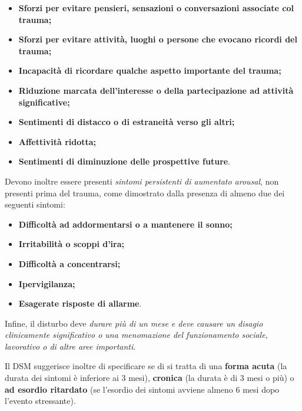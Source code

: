 \begin{itemize}
\item
  \textbf{Sforzi per evitare pensieri, sensazioni o conversazioni
  associate col trauma;}
\item
  \textbf{Sforzi per evitare attività, luoghi o persone che evocano
  ricordi del trauma;}
\item
  \textbf{Incapacità di ricordare qualche aspetto importante del
  trauma;}
\item
  \textbf{Riduzione marcata dell'interesse o della partecipazione ad
  attività significative;}
\item
  \textbf{Sentimenti di distacco o di estraneità verso gli altri;}
\item
  \textbf{Affettività ridotta;}
\item
  \textbf{Sentimenti di diminuzione delle prospettive future}.
\end{itemize}

Devono inoltre essere presenti \emph{sintomi persistenti di aumentato
arousal}, non presenti prima del trauma, come dimostrato dalla presenza
di almeno due dei seguenti sintomi:

\begin{itemize}
\item
  \textbf{Difficoltà ad addormentarsi o a mantenere il sonno;}
\item
  \textbf{Irritabilità o scoppi d'ira;}
\item
  \textbf{Difficoltà a concentrarsi;}
\item
  \textbf{Ipervigilanza;}
\item
  \textbf{Esagerate risposte di allarme}.
\end{itemize}

Infine, il disturbo deve \emph{durare più di un mese e deve causare un
disagio clinicamente significativo o una menomazione del funzionamento
sociale, lavorativo o di altre aree importanti}.

Il DSM suggerisce inoltre di specificare se di si tratta di una
\textbf{forma acuta} (la durata dei sintomi è inferiore ai 3 mesi),
\textbf{cronica} (la durata è di 3 mesi o più) o \textbf{ad esordio
ritardato} (se l'esordio dei sintomi avviene almeno 6 mesi dopo l'evento
stressante).

